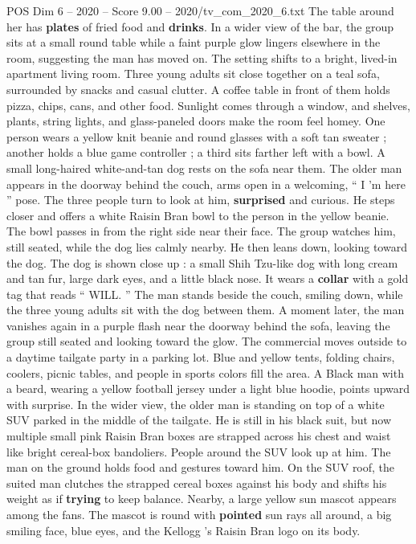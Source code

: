 \begin{textsample}{POS Dim 6 – 2020 – Score 9.00 – 2020/tv\_com\_2020\_6.txt}
The table around her has \textbf{plates} of fried food and \textbf{drinks}.
In a wider view of the bar, the group sits at a small round table while a faint purple glow lingers elsewhere in the room, suggesting the man has moved on.
The setting shifts to a bright, lived-in apartment living room.
Three young adults sit close together on a teal sofa, surrounded by snacks and casual clutter.
A coffee table in front of them holds pizza, chips, cans, and other food.
Sunlight comes through a window, and shelves, plants, string lights, and glass-paneled doors make the room feel homey.
One person wears a yellow knit beanie and round glasses with a soft tan sweater ; another holds a blue game controller ; a third sits farther left with a bowl.
A small long-haired white-and-tan dog rests on the sofa near them.
The older man appears in the doorway behind the couch, arms open in a welcoming, “ I ’m here ” pose.
The three people turn to look at him, \textbf{surprised} and curious.
He steps closer and offers a white Raisin Bran bowl to the person in the yellow beanie.
The bowl passes in from the right side near their face.
The group watches him, still seated, while the dog lies calmly nearby.
He then leans down, looking toward the dog.
The dog is shown close up : a small Shih Tzu-like dog with long cream and tan fur, large dark eyes, and a little black nose.
It wears a \textbf{collar} with a gold tag that reads “ WILL. ” The man stands beside the couch, smiling down, while the three young adults sit with the dog between them.
A moment later, the man vanishes again in a purple flash near the doorway behind the sofa, leaving the group still seated and looking toward the glow.
The commercial moves outside to a daytime tailgate party in a parking lot.
Blue and yellow tents, folding chairs, coolers, picnic tables, and people in sports colors fill the area.
A Black man with a beard, wearing a yellow football jersey under a light blue hoodie, points upward with surprise.
In the wider view, the older man is standing on top of a white SUV parked in the middle of the tailgate.
He is still in his black suit, but now multiple small pink Raisin Bran boxes are strapped across his chest and waist like bright cereal-box bandoliers.
People around the SUV look up at him.
The man on the ground holds food and gestures toward him.
On the SUV roof, the suited man clutches the strapped cereal boxes against his body and shifts his weight as if \textbf{trying} to keep balance.
Nearby, a large yellow sun mascot appears among the fans.
The mascot is round with \textbf{pointed} sun rays all around, a big smiling face, blue eyes, and the Kellogg ’s Raisin Bran logo on its body.

\end{textsample}
